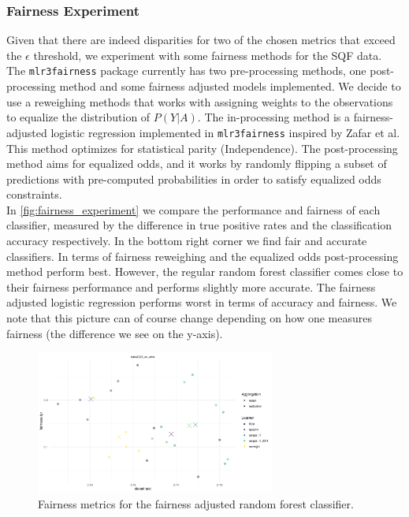 \subsubsection*{Fairness Experiment}
Given that there are indeed disparities for two of the chosen metrics that exceed the $\epsilon$ threshold, we experiment with some fairness methods for the SQF data.
The \texttt{mlr3fairness} package currently has two pre-processing methods, one post-processing method and some fairness adjusted models implemented. We decide to use a reweighing methods that works with assigning weights to the observations to equalize the distribution of $P(Y|A)$.
The in-processing method is a fairness-adjusted logistic regression implemented in \texttt{mlr3fairness} inspired by Zafar et al. This method optimizes for statistical parity (Independence). The post-processing method aims for equalized odds, and it works by randomly flipping a subset of predictions with pre-computed probabilities in order to satisfy equalized odds constraints. {\color{red}{reference to mlr3fairness book}} \\
In \autoref{fig:fairness_experiment} we compare the performance and fairness of each classifier, measured by the difference in true positive rates and the classification accuracy respectively. In the bottom right corner we find fair and accurate classifiers. In terms of fairness reweighing and the equalized odds post-processing method perform best. However, the regular random forest classifier comes close to their fairness performance and performs slightly more accurate. The fairness adjusted logistic regression performs worst in terms of accuracy and fairness.
We note that this picture can of course change depending on how one measures fairness (the difference we see on the y-axis).

\begin{figure}
    \centering
    \includegraphics[width=0.7\textwidth]{../figures/sqf_case_study_plot3.png}
    \caption{Fairness metrics for the fairness adjusted random forest classifier.}
    \label{fig:fairness_experiment}
\end{figure}

